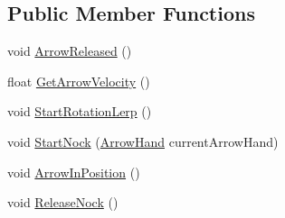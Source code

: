 \subsection*{Public Member Functions}
\begin{DoxyCompactItemize}
\item 
void \mbox{\hyperlink{class_valve_1_1_v_r_1_1_interaction_system_1_1_longbow_a1c9904dc841fdd685790ac4b5568dd0a}{Arrow\+Released}} ()
\item 
float \mbox{\hyperlink{class_valve_1_1_v_r_1_1_interaction_system_1_1_longbow_a527b263071c9dc84cae6571626ad6a70}{Get\+Arrow\+Velocity}} ()
\item 
void \mbox{\hyperlink{class_valve_1_1_v_r_1_1_interaction_system_1_1_longbow_ae7a746228eaa9c9cb02b612ac21e2c1e}{Start\+Rotation\+Lerp}} ()
\item 
void \mbox{\hyperlink{class_valve_1_1_v_r_1_1_interaction_system_1_1_longbow_ab6c7f26589147353e5360df8fd2452d9}{Start\+Nock}} (\mbox{\hyperlink{class_valve_1_1_v_r_1_1_interaction_system_1_1_arrow_hand}{Arrow\+Hand}} current\+Arrow\+Hand)
\item 
void \mbox{\hyperlink{class_valve_1_1_v_r_1_1_interaction_system_1_1_longbow_a279e4793dd08ca0e19cf3ad84c6f65ad}{Arrow\+In\+Position}} ()
\item 
void \mbox{\hyperlink{class_valve_1_1_v_r_1_1_interaction_system_1_1_longbow_af32e9030daa9811c2cc879a2769948f9}{Release\+Nock}} ()
\end{DoxyCompactItemize}
